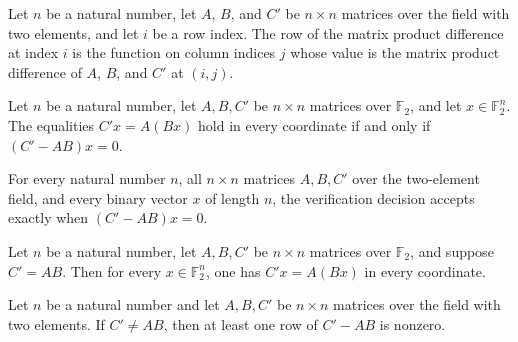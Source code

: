 \begin{definition}
\label{FABL.matrixProductDifferenceRow}
\leanok
{}
Let $n$ be a natural number, let $A$, $B$, and $C'$ be $n\times n$ matrices over the
field with two elements, and let $i$ be a row index. The row of the matrix product
difference at index $i$ is the function on column indices $j$ whose value is the matrix
product difference of $A$, $B$, and $C'$ at $(i,j)$.
\end{definition}

\begin{theorem}
\label{FABL.matrixProductVerificationPredicate_iff_difference_mulVec_eq_zero}
\leanok
{}
Let $n$ be a natural number, let $A,B,C'$ be $n\times n$ matrices over $\mathbb{F}_2$,
and let $x\in\mathbb{F}_2^n$. The equalities $C'x=A(Bx)$ hold in every coordinate if and
only if $(C'-AB)x=0$.
\end{theorem}

\begin{theorem}
\label{FABL.matrixProductVerificationDecision_eq_true_iff}
\leanok
{}
For every natural number $n$, all $n\times n$ matrices $A,B,C'$ over the two-element
field, and every binary vector $x$ of length $n$, the verification decision accepts
exactly when $(C'-AB)x=0$.
\end{theorem}

\begin{theorem}
\label{FABL.matrixProductVerificationPredicate_of_eq}
\leanok
{}
Let $n$ be a natural number, let $A,B,C'$ be $n\times n$ matrices over $\mathbb{F}_2$,
and suppose $C'=AB$. Then for every $x\in\mathbb{F}_2^n$, one has $C'x=A(Bx)$ in every
coordinate.
\end{theorem}

\begin{theorem}
\label{FABL.exists_matrixProductDifferenceRow_ne_zero}
\leanok
{}
Let $n$ be a natural number and let $A,B,C'$ be $n\times n$ matrices over the field with
two elements. If $C'\ne AB$, then at least one row of $C'-AB$ is nonzero.
\end{theorem}

